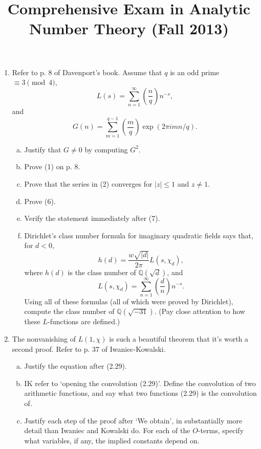 \documentclass[12pt]{amsart}
\title{Comprehensive Exam in Analytic Number Theory (Fall 2013)}
\begin{document}
\maketitle
\vskip 1.0cm
\begin{enumerate}[1.]
\item
Refer to p. 8 of Davenport's book. Assume that $q$ is an odd prime $\equiv 3 \pmod{4}$,
\[
L(s) = \sum_{n = 1}^{\infty} \left( \frac{n}{q} \right) n^{-s},
\]
and
\[
G(n) = \sum_{m = 1}^{q - 1} \left( \frac{m}{q} \right) \exp(2 \pi i mn/q).
\]
\begin{enumerate}[(a)]
\item
Justify that $G \neq 0$ by computing $G^2$.
\item
Prove (1) on p. 8.
\item
Prove that the series in (2) converges for $|z| \leq 1$ and $z \neq 1$.
\item
Prove (6).
\item
Verify the statement immediately after (7).
\item
Dirichlet's class number formula for imaginary quadratic fields
says that, for $d < 0$, 
\[
h(d) = \frac{ w \sqrt{|d|}}{2 \pi} L(s, \chi_d),
\]
where $h(d)$ is the class number of $\mathbb{Q}({\sqrt{d}})$, and
\[
L(s, \chi_d) = \sum_{n = 1}^{\infty} \left( \frac{d}{n} \right) n^{-s}.
\]
Using all of these formulas (all of which were proved by Dirichlet), compute the
class number of $\mathbb{Q}(\sqrt{-31})$. (Pay close attention to how these $L$-functions are defined.)
\end{enumerate}
\vskip 0.5cm

\item
The nonvanishing of $L(1, \chi)$ is such a beautiful theorem that it's worth a second
proof. Refer to p. 37 of Iwaniec-Kowalski.
\begin{enumerate}[(a)]
\item
Justify the equation after (2.29).
\item
IK refer to `opening the convolution (2.29)'. Define the convolution of two arithmetic
functions, and say what two functions (2.29) is the convolution of.
\item
Justify each step of the proof after `We obtain', in substantially more detail
than Iwaniec and Kowalski do. For each of the $O$-terms, specify what variables,
if any, the implied constants depend on.


\end{enumerate}
\end{enumerate}
\end{document}
